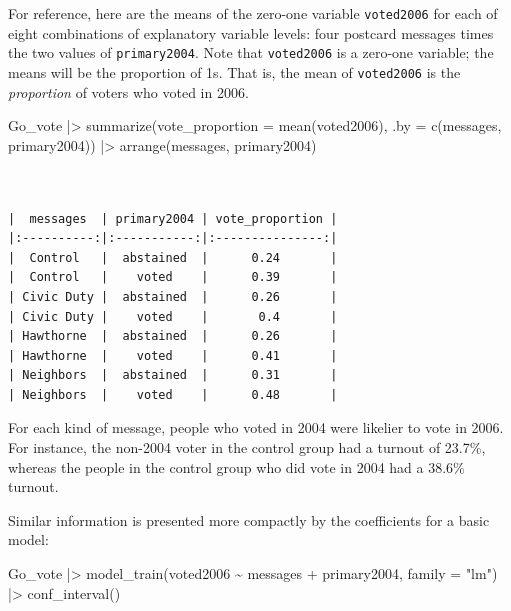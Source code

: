 \documentclass[
  letterpaper,
  DIV=11,
  numbers=noendperiod,
  oneside]{scrartcl}
\newenvironment{Shaded}{\begin{snugshade}}{\end{snugshade}}
\newcommand{\AttributeTok}[1]{\textcolor[rgb]{0.40,0.45,0.13}{#1}}
\newcommand{\FunctionTok}[1]{\textcolor[rgb]{0.28,0.35,0.67}{#1}}
\newcommand{\NormalTok}[1]{\textcolor[rgb]{0.00,0.23,0.31}{#1}}
\newcommand{\SpecialCharTok}[1]{\textcolor[rgb]{0.37,0.37,0.37}{#1}}
\newcommand{\StringTok}[1]{\textcolor[rgb]{0.13,0.47,0.30}{#1}}
\begin{document}
For reference, here are the means of the zero-one variable
\texttt{voted2006} for each of eight combinations of explanatory
variable levels: four postcard messages times the two values of
\texttt{primary2004}. Note that \texttt{voted2006} is a zero-one
variable; the means will be the proportion of 1s. That is, the mean of
\texttt{voted2006} is the \emph{proportion} of voters who voted in 2006.

\begin{Shaded}
\begin{Highlighting}[]
\NormalTok{Go\_vote }\SpecialCharTok{|\textgreater{}} 
  \FunctionTok{summarize}\NormalTok{(}\AttributeTok{vote\_proportion =} \FunctionTok{mean}\NormalTok{(voted2006),}
            \AttributeTok{.by =} \FunctionTok{c}\NormalTok{(messages, primary2004)) }\SpecialCharTok{|\textgreater{}}
  \FunctionTok{arrange}\NormalTok{(messages, primary2004)}
\end{Highlighting}
\end{Shaded}

\begin{verbatim}


|  messages  | primary2004 | vote_proportion |
|:----------:|:-----------:|:---------------:|
|  Control   |  abstained  |      0.24       |
|  Control   |    voted    |      0.39       |
| Civic Duty |  abstained  |      0.26       |
| Civic Duty |    voted    |       0.4       |
| Hawthorne  |  abstained  |      0.26       |
| Hawthorne  |    voted    |      0.41       |
| Neighbors  |  abstained  |      0.31       |
| Neighbors  |    voted    |      0.48       |
\end{verbatim}

For each kind of message, people who voted in 2004 were likelier to vote
in 2006. For instance, the non-2004 voter in the control group had a
turnout of 23.7\%, whereas the people in the control group who did vote
in 2004 had a 38.6\% turnout.

Similar information is presented more compactly by the coefficients for
a basic model:

\begin{Shaded}
\begin{Highlighting}[]
\NormalTok{Go\_vote }\SpecialCharTok{|\textgreater{}} 
  \FunctionTok{model\_train}\NormalTok{(voted2006 }\SpecialCharTok{\textasciitilde{}}\NormalTok{ messages }\SpecialCharTok{+}\NormalTok{ primary2004, }\AttributeTok{family =} \StringTok{"lm"}\NormalTok{) }\SpecialCharTok{|\textgreater{}}
  \FunctionTok{conf\_interval}\NormalTok{()}
\end{Highlighting}
\end{Shaded}
\end{document}
